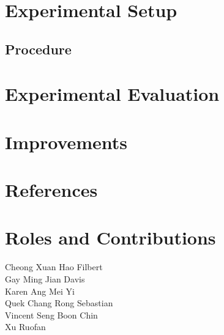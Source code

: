 \documentclass[letterpaper]{article}
\begin{document}
\section{Experimental Setup}

\subsection{Procedure}

\section{Experimental Evaluation}

\section{Improvements}


\section{References}


\section{Roles and Contributions}

\begin{description}
\item [Cheong Xuan Hao Filbert]
\item [Gay Ming Jian Davis]
\item [Karen Ang Mei Yi]
\item [Quek Chang Rong Sebastian]
\item [Vincent Seng Boon Chin]
\item [Xu Ruofan]
\end{description}
\end{document}
